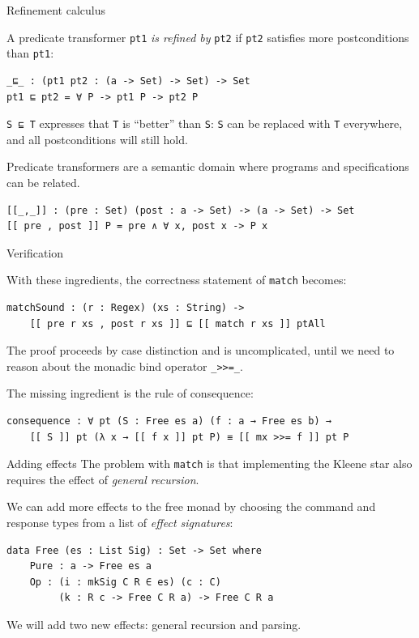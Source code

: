 \documentclass[ignorenonframetext,]{beamer}
\newcommand{\Agda}[1]{\texttt{#1}\xspace}
\newcommand{\match}{\Agda{match}}
\begin{document}
\begin{frame}[fragile]{Refinement calculus}

A predicate transformer \Agda{pt1} \emph{is refined by} \Agda{pt2} if \Agda{pt2} satisfies more postconditions than \Agda{pt1}:

\begin{verbatim}
_⊑_ : (pt1 pt2 : (a -> Set) -> Set) -> Set
pt1 ⊑ pt2 = ∀ P -> pt1 P -> pt2 P
\end{verbatim}

\Agda{S ⊑ T} expresses that \Agda{T} is ``better'' than \Agda{S}:
\Agda{S} can be replaced with \Agda{T} everywhere, and all postconditions will still hold.

\pause

Predicate transformers are a semantic domain where programs and specifications can be related.
\begin{verbatim}
[[_,_]] : (pre : Set) (post : a -> Set) -> (a -> Set) -> Set
[[ pre , post ]] P = pre ∧ ∀ x, post x -> P x
\end{verbatim}

\end{frame}

\begin{frame}[fragile]{Verification}

With these ingredients, the correctness statement of \match becomes:
\begin{verbatim}
matchSound : (r : Regex) (xs : String) ->
    [[ pre r xs , post r xs ]] ⊑ [[ match r xs ]] ptAll
\end{verbatim}

The proof proceeds by case distinction and is uncomplicated, until we need to reason about the monadic bind operator \Agda{\_>>=\_}.

\pause

The missing ingredient is the rule of consequence:
\begin{verbatim}
consequence : ∀ pt (S : Free es a) (f : a → Free es b) →
    [[ S ]] pt (λ x → [[ f x ]] pt P) ≡ [[ mx >>= f ]] pt P
\end{verbatim}

\end{frame}

\begin{frame}[fragile]{Adding effects}
The problem with \match is that implementing the Kleene star also requires the effect of \emph{general recursion}.

We can add more effects to the free monad by choosing the command and response types from a list of \emph{effect signatures}:
\begin{verbatim}
data Free (es : List Sig) : Set -> Set where
    Pure : a -> Free es a
    Op : (i : mkSig C R ∈ es) (c : C)
         (k : R c -> Free C R a) -> Free C R a
\end{verbatim}

We will add two new effects: general recursion and parsing.
\end{frame}
\end{document}
